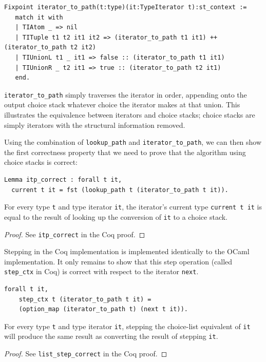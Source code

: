 \documentclass[a4paper,english]{lipics-v2019}
\begin{document}
\begin{small}\begin{verbatim}
Fixpoint iterator_to_path(t:type)(it:TypeIterator t):st_context :=
   match it with
   | TIAtom _ => nil
   | TITuple t1 t2 it1 it2 => (iterator_to_path t1 it1) ++ (iterator_to_path t2 it2)
   | TIUnionL t1 _ it1 => false :: (iterator_to_path t1 it1)
   | TIUnionR _ t2 it1 => true :: (iterator_to_path t2 it1)
   end.
\end{verbatim}\end{small}

\verb|iterator_to_path| simply traverses the iterator in order, appending onto the
output choice stack whatever choice the iterator makes at that union. This illustrates
the equivalence between iterators and choice stacks; choice stacks are simply iterators
with the structural information removed.

Using the combination of \verb|lookup_path| and \verb|iterator_to_path|, we
can then show the first correctness property that we need to prove that the
algorithm using choice stacks is correct:

\begin{lemma}
\begin{small}\begin{verbatim}
Lemma itp_correct : forall t it, 
  current t it = fst (lookup_path t (iterator_to_path t it)).
\end{verbatim}\end{small}

For every type \verb|t| and type iterator \verb|it|, the iterator's current type \verb|current t it| is equal
to the result of looking up the conversion of \verb|it| to a choice stack.
\end{lemma}
\begin{proof}
See \verb|itp_correct| in the Coq proof.
\end{proof}

Stepping in the Coq implementation is implemented identically to the OCaml
implementation. It only remains to show that this step operation (called
\verb|step_ctx| in Coq) is correct with respect to the iterator
\verb|next|.

\begin{lemma}
\begin{small}\begin{verbatim}
forall t it,
    step_ctx t (iterator_to_path t it) =
    (option_map (iterator_to_path t) (next t it)).
\end{verbatim}\end{small}
For every type \verb|t| and type iterator \verb|it|,
stepping the choice-list equivalent of \verb|it| will
produce the same result as converting the result of stepping
\verb|it|.
\end{lemma}
\begin{proof}
See \verb|list_step_correct| in the Coq proof.
\end{proof}
\end{document}
